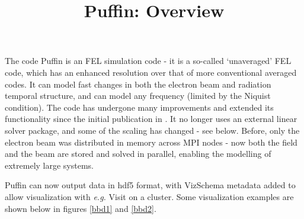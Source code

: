 \documentclass[12pt]{article}%
\begin{document}
\title{Puffin: Overview}

\maketitle

The code Puffin\cite{puffin} is an FEL simulation code  - it is a so-called `unaveraged' FEL code, which has an enhanced resolution over that of more conventional averaged codes. It can model fast changes in both the electron beam and radiation temporal structure, and can model any frequency (limited by the Niquist condition).  The code has undergone many improvements and extended its functionality since the initial publication in \cite{puffin}. It no longer uses an external linear solver package, and some of the scaling has changed - see below. Before, only the electron beam was distributed in memory across MPI nodes - now both the field and the beam are stored and solved in parallel, enabling the modelling of extremely large systems.

Puffin can now output data in hdf5 format, with VizSchema metadata added to allow visualization with \textit{e.g.} Visit on a cluster. Some visualization examples are shown below in figures \ref{bbd1} and \ref{bbd2}.
\end{document}
